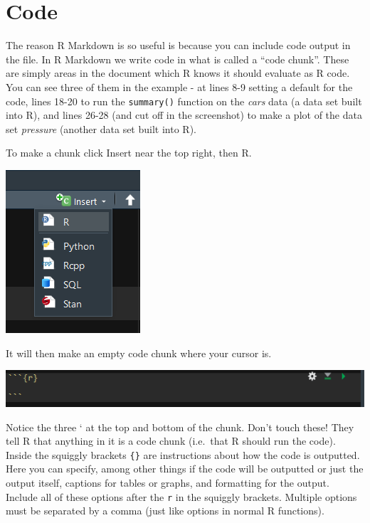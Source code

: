 \documentclass[
  12pt,
]{book}
\begin{document}
\hypertarget{code}{%
\section{Code}\label{code}}

The reason R Markdown is so useful is because you can include code output in the file. In R Markdown we write code in what is called a ``code chunk''. These are simply areas in the document which R knows it should evaluate as R code. You can see three of them in the example - at lines 8-9 setting a default for the code, lines 18-20 to run the \texttt{summary()} function on the \emph{cars} data (a data set built into R), and lines 26-28 (and cut off in the screenshot) to make a plot of the data set \emph{pressure} (another data set built into R).

To make a chunk click Insert near the top right, then R.

\includegraphics{images/markdown3.PNG}

It will then make an empty code chunk where your cursor is.

\includegraphics{images/chunk_example.PNG}

Notice the three ` at the top and bottom of the chunk. Don't touch these! They tell R that anything in it is a code chunk (i.e.~that R should run the code). Inside the squiggly brackets \texttt{\{\}} are instructions about how the code is outputted. Here you can specify, among other things if the code will be outputted or just the output itself, captions for tables or graphs, and formatting for the output. Include all of these options after the \texttt{r} in the squiggly brackets. Multiple options must be separated by a comma (just like options in normal R functions).
\end{document}
